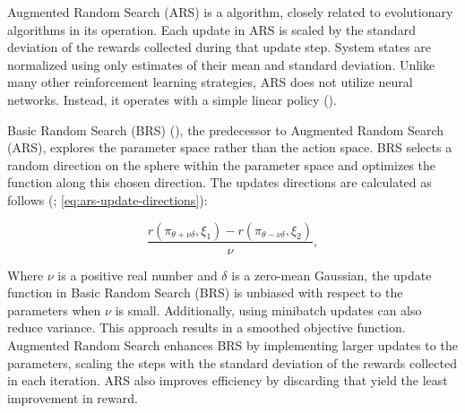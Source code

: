             \bigskip
            
            \noindent Augmented Random Search (ARS) is a algorithm, closely related to evolutionary algorithms in its operation. Each update in ARS is scaled by the standard deviation of the rewards collected during that update step. System states are normalized using only estimates of their mean and standard deviation. Unlike many other reinforcement learning strategies, ARS does not utilize neural networks. Instead, it operates with a simple linear policy (\textcolor{deepblue}{\cite{mania2018simple}}).
            
            \bigskip
            
            \noindent Basic Random Search (BRS) (\textcolor{deepblue}{\cite{mania2018simple}}), the predecessor to Augmented Random Search (ARS), explores the parameter space rather than the action space. BRS selects a random direction on the sphere within the parameter space and optimizes the function along this chosen direction. The updates directions are calculated as follows (\textcolor{deepblue}{\cite{mania2018simple}; \autoref{eq:ars-update-directions}}):
            
            \begin{equation}
                \frac{r(\pi_{\theta+\nu\delta}, \xi_1) - r(\pi_{\theta-\nu\delta}, \xi_2)}{\nu},
                \label{eq:ars-update-directions}
            \end{equation}
            
            \noindent Where $\nu$ is a positive real number and $\delta$ is a zero-mean Gaussian, the update function in Basic Random Search (BRS) is unbiased with respect to the parameters when $\nu$ is small. Additionally, using minibatch updates can also reduce variance. This approach results in a smoothed objective function. Augmented Random Search enhances BRS by implementing larger updates to the parameters, scaling the steps with the standard deviation of the rewards collected in each iteration. ARS also improves efficiency by discarding that yield the least improvement in reward.
            
